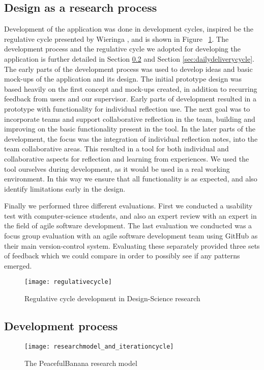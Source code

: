 \subsection{Design as a research process}
Development of the application was done in development cycles, inspired be the regulative cycle presented by Wieringa \citep{wieringa}, and is shown in Figure ~\ref{regulativecycle}. The development process and the regulative cycle we adopted for developing the application is further detailed in Section \ref{subsec:devprocess} and Section \ref{sec:dailydeliverycycle}.
The early parts of the development process was used to develop ideas and basic mock-ups of the application and its design. The initial prototype design was based heavily on the first concept and mock-ups created, in addition to recurring feedback from users and our supervisor. Early parts of development resulted in a prototype with functionality for individual reflection use. The next goal was to incorporate teams and support collaborative reflection in the team, building and improving on the basic functionality present in the tool. In the later parts of the development, the focus was the integration of individual reflection notes, into the team collaborative areas. This resulted in a tool for both individual and collaborative aspects for reflection and learning from experiences. We used the tool ourselves during development, as it would be used in a real working environment. In this way we ensure that all functionality is as expected, and also identify limitations early in the design. 

Finally we performed three different evaluations. First we conducted a usability test with computer-science students, and also an expert review with an expert in the field of agile software development. The last evaluation we conducted was a focus group evaluation with an agile software development team using GitHub as their main version-control system. Evaluating these separately provided three sets of feedback which we could compare in order to possibly see if any patterns emerged.

\begin{figure}[!htpb]
\centering
	\texttt{[image: regulativecycle]}
\caption{Regulative cycle development in Design-Science research \citep{wieringa}}
\label{regulativecycle}
\end{figure}

\subsection{Development process}
\label{subsec:devprocess}
\begin{figure}[!htpb]
\centering
	\texttt{[image: researchmodel\_and\_iterationcycle]}
\caption{The PeacefulBanana research model }
\label{researchmodel}
\end{figure}

